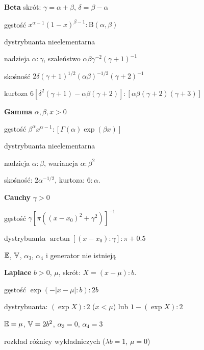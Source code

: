\begin{multicols*}{3}
\textbf{Beta} \dotfill skrót: $\gamma = \alpha + \beta$, $\delta = \beta - \alpha$
\begin{enumx}
\item gęstość $x^{\alpha - 1} (1-x)^{\beta - 1} : {\textrm{B}(\alpha, \beta)}$
\item dystrybuanta nieelementarna
\item nadzieja $\alpha : \gamma$, szaleństwo $\alpha \beta \gamma ^{-2} (\gamma + 1)^{-1}$
\item skośność $2 \delta (\gamma + 1)^{1/2} (\alpha \beta)^{-1/2} (\gamma+2)^{-1}$
\item kurtoza $6[\delta^2 (\gamma+ 1) - \alpha \beta (\gamma + 2)] : [\alpha \beta (\gamma + 2) (\gamma + 3)]$
\end{enumx}

\textbf{Gamma} \dotfill $\alpha, \beta, x > 0$
\begin{enumx}
\item gęstość $\beta^\alpha x^{\alpha - 1} : [\Gamma(\alpha) \exp (\beta x)]$
\item dystrybuanta nieelementarna
\item nadzieja $\alpha : \beta$, wariancja $\alpha : \beta ^2$
\item skośność: $2 \alpha^{-1/2}$, kurtoza: $6 : \alpha$.
\end{enumx}

\textbf{Cauchy} \dotfill $\gamma > 0$
\begin{enumx}
\item gęstość $\gamma [\pi ((x- x_0)^2 + \gamma^2)]^{-1}$
\item dystrybuanta $\arctan [(x - x_0): \gamma] : \pi + 0.5$
\item $\mathbb{E}$, $\mathbb{V}$, $\alpha_3$, $\alpha_4$ i generator nie istnieją
\end{enumx}

\textbf{Laplace} \dotfill $b > 0$, $\mu$, skrót: $X = (x - \mu) : b$.
\begin{enumx}
\item gęstość $\exp (-|x - \mu|:b) : 2b$
\item dystrybuanta: $(\exp X) : 2$ ($x < \mu$) lub $1 - (\exp X) : 2$
\item $\mathbb{E} = \mu$, $\mathbb{V} = 2b^2$, $\alpha_3 = 0$, $\alpha_4 = 3$
\item rozkład różnicy wykładniczych ($\lambda b = 1$, $\mu = 0$)
\end{enumx}


\end{multicols*}
